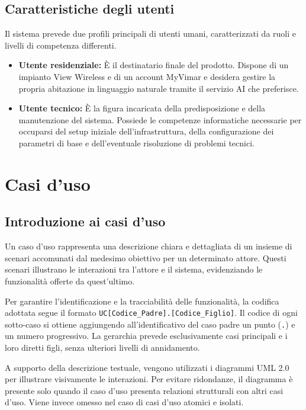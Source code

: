\documentclass[11pt, a4paper]{article}
\begin{document}
\subsection{Caratteristiche degli utenti}
Il sistema prevede due profili principali di utenti umani, caratterizzati da ruoli e livelli di competenza differenti.
\begin{itemize}
    \item \textbf{Utente residenziale:} È il destinatario finale del prodotto. Dispone di un impianto View Wireless e di un account MyVimar e desidera gestire la propria abitazione in linguaggio naturale tramite il servizio AI che preferisce.
    \item \textbf{Utente tecnico:} È la figura incaricata della predisposizione e della manutenzione del sistema. Possiede le competenze informatiche necessarie per occuparsi del setup iniziale dell'infrastruttura, della configurazione dei parametri di base e dell'eventuale risoluzione di problemi tecnici.
\end{itemize}
\newpage


\section{Casi d'uso}

\subsection{Introduzione ai casi d'uso}
Un caso d'uso rappresenta una descrizione chiara e dettagliata di un insieme di scenari accomunati dal medesimo obiettivo per un determinato attore. Questi scenari illustrano le interazioni tra l'attore e il sistema, evidenziando le funzionalità offerte da quest'ultimo.

\noindent Per garantire l'identificazione e la tracciabilità delle funzionalità, la codifica adottata segue il formato \texttt{UC[Codice\_Padre].[Codice\_Figlio]}. Il codice di ogni sotto-caso si ottiene aggiungendo all'identificativo del caso padre un punto (\texttt{.}) e un numero progressivo. La gerarchia prevede esclusivamente casi principali e i loro diretti figli, senza ulteriori livelli di annidamento.

\noindent A supporto della descrizione testuale, vengono utilizzati i diagrammi UML 2.0 per illustrare visivamente le interazioni. Per evitare ridondanze, il diagramma è presente solo quando il caso d'uso presenta relazioni strutturali con altri casi d'uso. Viene invece omesso nel caso di casi d'uso atomici e isolati.
\end{document}
